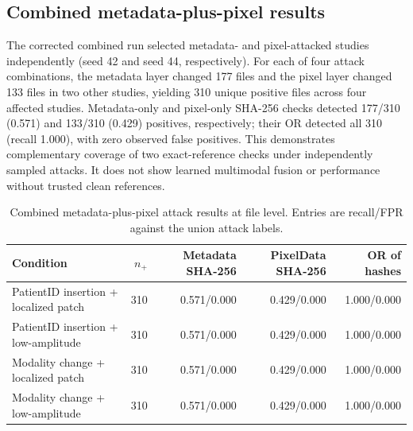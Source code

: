 \documentclass[journal]{IEEEtran}
\begin{document}
  \subsection{Combined metadata-plus-pixel results}
  The corrected combined run selected metadata- and pixel-attacked studies independently (seed 42 and seed 44, respectively). For each of four attack combinations, the metadata layer changed 177 files and the pixel layer changed 133 files in two other studies, yielding 310 unique positive files across four affected studies. Metadata-only and pixel-only SHA-256 checks detected 177/310 (0.571) and 133/310 (0.429) positives, respectively; their OR detected all 310 (recall 1.000), with zero observed false positives. This demonstrates complementary coverage of two exact-reference checks under independently sampled attacks. It does not show learned multimodal fusion or performance without trusted clean references.
  
  \begin{table}[t]
  \caption{Combined metadata-plus-pixel attack results at file level. Entries are recall/FPR against the union attack labels.}
  \label{tab:combined}
  \centering\footnotesize
  \begin{tabular}{lrrrr}
  \toprule
  Condition & $n_+$ & Metadata SHA-256 & PixelData SHA-256 & OR of hashes \\
  \midrule
  PatientID insertion + localized patch & 310 & 0.571/0.000 & 0.429/0.000 & 1.000/0.000 \\
  PatientID insertion + low-amplitude & 310 & 0.571/0.000 & 0.429/0.000 & 1.000/0.000 \\
  Modality change + localized patch & 310 & 0.571/0.000 & 0.429/0.000 & 1.000/0.000 \\
  Modality change + low-amplitude & 310 & 0.571/0.000 & 0.429/0.000 & 1.000/0.000 \\
  \bottomrule
  \end{tabular}
  \end{table}
  
\end{document}

